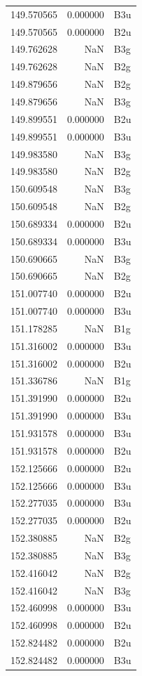 \begin{longtable}{rrl}
149.570565 & 0.000000 & B3u \\
149.570565 & 0.000000 & B2u \\
149.762628 & NaN & B3g \\
149.762628 & NaN & B2g \\
149.879656 & NaN & B2g \\
149.879656 & NaN & B3g \\
149.899551 & 0.000000 & B2u \\
149.899551 & 0.000000 & B3u \\
149.983580 & NaN & B3g \\
149.983580 & NaN & B2g \\
150.609548 & NaN & B3g \\
150.609548 & NaN & B2g \\
150.689334 & 0.000000 & B2u \\
150.689334 & 0.000000 & B3u \\
150.690665 & NaN & B3g \\
150.690665 & NaN & B2g \\
151.007740 & 0.000000 & B2u \\
151.007740 & 0.000000 & B3u \\
151.178285 & NaN & B1g \\
151.316002 & 0.000000 & B3u \\
151.316002 & 0.000000 & B2u \\
151.336786 & NaN & B1g \\
151.391990 & 0.000000 & B2u \\
151.391990 & 0.000000 & B3u \\
151.931578 & 0.000000 & B3u \\
151.931578 & 0.000000 & B2u \\
152.125666 & 0.000000 & B2u \\
152.125666 & 0.000000 & B3u \\
152.277035 & 0.000000 & B3u \\
152.277035 & 0.000000 & B2u \\
152.380885 & NaN & B2g \\
152.380885 & NaN & B3g \\
152.416042 & NaN & B2g \\
152.416042 & NaN & B3g \\
152.460998 & 0.000000 & B3u \\
152.460998 & 0.000000 & B2u \\
152.824482 & 0.000000 & B2u \\
152.824482 & 0.000000 & B3u \\

\end{longtable}
